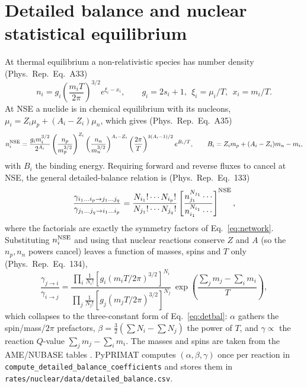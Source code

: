 \documentclass[11pt,a4paper]{article}
\newcommand{\code}[1]{\texttt{#1}}
\newcommand{\PR}{Phys.\ Rep.}
\begin{document}
\section{Detailed balance and nuclear statistical equilibrium}\label{app:nse}
At thermal equilibrium a non-relativistic species has number density (\PR\
Eq.~A33)
\begin{equation}
  n_i = g_i\left(\frac{m_iT}{2\pi}\right)^{3/2}e^{\xi_i-x_i},
  \qquad g_i=2s_i+1,\ \ \xi_i=\mu_i/T,\ \ x_i=m_i/T .
\end{equation}
At NSE a nuclide is in chemical equilibrium with its nucleons,
$\mu_i=Z_i\mu_p+(A_i-Z_i)\mu_n$, which gives (\PR\ Eq.~A35)
\begin{equation}
  n_i^{\rm NSE} = \frac{g_i m_i^{3/2}}{2^{A_i}}
    \left(\frac{n_p}{m_p^{3/2}}\right)^{Z_i}
    \left(\frac{n_n}{m_n^{3/2}}\right)^{A_i-Z_i}
    \left(\frac{2\pi}{T}\right)^{3(A_i-1)/2} e^{B_i/T},
  \qquad B_i = Z_im_p+(A_i-Z_i)m_n-m_i,
\end{equation}
with $B_i$ the binding energy. Requiring forward and reverse fluxes to cancel at
NSE, the general detailed-balance relation is (\PR\ Eq.~133)
\begin{equation}
  \frac{\gamma_{i_1\dots i_p\to j_1\dots j_q}}{\gamma_{j_1\dots j_q\to i_1\dots i_p}}
   = \frac{N_{i_1}!\cdots N_{i_p}!}{N_{j_1}!\cdots N_{j_q}!}
     \left[\frac{n_{j_1}^{N_{j_1}}\cdots}{n_{i_1}^{N_{i_1}}\cdots}\right]^{\rm NSE},
\end{equation}
where the factorials are exactly the symmetry factors of
Eq.~\eqref{eq:network}. Substituting $n_i^{\rm NSE}$ and using that nuclear
reactions conserve $Z$ and $A$ (so the $n_p,n_n$ powers cancel) leaves a function
of masses, spins and $T$ only (\PR\ Eq.~134),
\begin{equation}
  \frac{\gamma_{j\to i}}{\gamma_{i\to j}}
   = \frac{\prod_i \tfrac{1}{N_i!}\left[g_i(m_iT/2\pi)^{3/2}\right]^{N_i}}
          {\prod_j \tfrac{1}{N_j!}\left[g_j(m_jT/2\pi)^{3/2}\right]^{N_j}}\,
     \exp\!\left(\frac{\sum_j m_j-\sum_i m_i}{T}\right),
\end{equation}
which collapses to the three-constant form of Eq.~\eqref{eq:detbal}: $\alpha$
gathers the spin/mass/$2\pi$ prefactors, $\beta=\tfrac{3}{2}(\sum N_i-\sum N_j)$
the power of $T$, and $\gamma\propto$ the reaction $Q$-value $\sum_j m_j-\sum_i
m_i$. The masses and spins are taken from the AME/NUBASE tables
\cite{AME2016}. PyPRIMAT computes $(\alpha,\beta,\gamma)$ once per reaction in
\code{compute\_detailed\_balance\_coefficients} and stores them in
\code{rates/nuclear/data/detailed\_balance.csv}.
\end{document}
